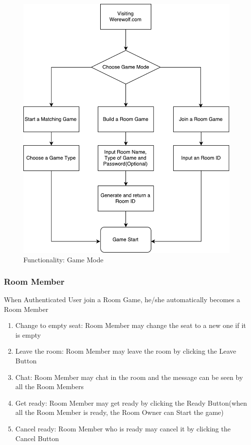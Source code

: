 \documentclass[11pt]{article}
\begin{document}
\begin{figure}
\begin{minipage}{.5\linewidth}
\includegraphics[width=.9\linewidth]{func-index.pdf}
\caption{Functionality: Game Mode}
\label{fig:func-index}
\end{minipage}
\end{figure}

\subsubsection{Room Member}
When Authenticated User join a Room Game, he/she automatically becomes a Room Member
\begin{enumerate}
\item
Change to empty seat: Room Member may change the seat to a new one if it is empty
\item
Leave the room: Room Member may leave the room by clicking the Leave Button
\item
Chat: Room Member may chat in the room and the message can be seen by all the Room Members
\item
Get ready: Room Member may get ready by clicking the Ready Button(when all the Room Member is ready, the Room Owner can Start the game)
\item
Cancel ready: Room Member who is ready may cancel it by clicking the Cancel Button
\end{enumerate}
\end{document}
